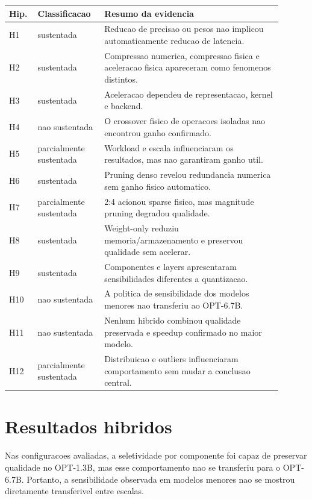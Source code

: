 \begin{longtable}{@{}p{0.08\linewidth}p{0.22\linewidth}p{0.60\linewidth}@{}}
\toprule
\textbf{Hip.} & \textbf{Classificacao} & \textbf{Resumo da evidencia} \\
\midrule
H1 & sustentada & Reducao de precisao ou pesos nao implicou automaticamente reducao de latencia. \\
H2 & sustentada & Compressao numerica, compressao fisica e aceleracao fisica apareceram como fenomenos distintos. \\
H3 & sustentada & Aceleracao dependeu de representacao, kernel e backend. \\
H4 & nao sustentada & O crossover fisico de operacoes isoladas nao encontrou ganho confirmado. \\
H5 & parcialmente sustentada & Workload e escala influenciaram os resultados, mas nao garantiram ganho util. \\
H6 & sustentada & Pruning denso revelou redundancia numerica sem ganho fisico automatico. \\
H7 & parcialmente sustentada & 2:4 acionou sparse fisico, mas magnitude pruning degradou qualidade. \\
H8 & sustentada & Weight-only reduziu memoria/armazenamento e preservou qualidade sem acelerar. \\
H9 & sustentada & Componentes e layers apresentaram sensibilidades diferentes a quantizacao. \\
H10 & nao sustentada & A politica de sensibilidade dos modelos menores nao transferiu ao OPT-6.7B. \\
H11 & nao sustentada & Nenhum hibrido combinou qualidade preservada e speedup confirmado no maior modelo. \\
H12 & parcialmente sustentada & Distribuicao e outliers influenciaram comportamento sem mudar a conclusao central. \\
\bottomrule
\end{longtable}

\section{Resultados hibridos}

Nas configuracoes avaliadas, a seletividade por componente foi capaz de
preservar qualidade no OPT-1.3B, mas esse comportamento nao se transferiu para
o OPT-6.7B. Portanto, a sensibilidade observada em modelos menores nao se
mostrou diretamente transferivel entre escalas.

